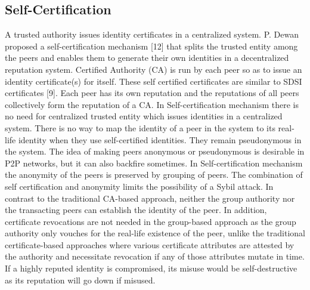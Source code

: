  
\subsection{Self-Certification}
A trusted authority issues identity certificates in a
centralized system. P. Dewan proposed a self-certification
mechanism [12] that splits the trusted entity among the
peers and enables them to generate their own identities in a
decentralized reputation system. Certified Authority (CA)
is run by each peer so as to issue an identity certificate(s)
for itself. These self certified certificates are similar to
SDSI certificates [9]. Each peer has its own reputation and
the reputations of all peers collectively form the reputation
of a CA.
In Self-certification mechanism there is no need for
centralized trusted entity which issues identities in a
centralized system. There is no way to map the identity of
a peer in the system to its real-life identity when they use
self-certified identities. They remain pseudonymous in the
system. The idea of making peers anonymous or
pseudonymous is desirable in P2P networks, but it can also
backfire sometimes.
In Self-certification mechanism the anonymity of the peers
is preserved by grouping of peers. The combination of self
certification and anonymity limits the possibility of a Sybil
attack. In contrast to the traditional CA-based approach,
neither the group authority nor the transacting peers can
establish the identity of the peer. In addition, certificate
revocations are not needed in the group-based approach as
the group authority only vouches for the real-life existence
of the peer, unlike the traditional certificate-based
approaches where various certificate attributes are attested
by the authority and necessitate revocation if any of those
attributes mutate in time. If a highly reputed identity is
compromised, its misuse would be self-destructive as its
reputation will go down if misused.
